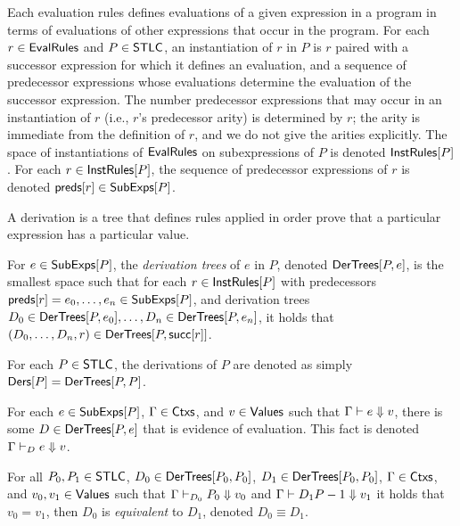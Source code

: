 Each evaluation rules defines evaluations of a given expression in a
program in terms of evaluations of other expressions that occur in the
program.
%
For each $r \in \mathsf{EvalRules}$ and $P \in \mathsf{STLC}$, an instantiation of $r$
in $P$ is $r$ paired with a successor expression for which it defines
an evaluation, and a sequence of predecessor expressions whose
evaluations determine the evaluation of the successor expression.
%
The number predecessor expressions that may occur in an instantiation
of $r$ (i.e., $r$'s predecessor arity) is determined by $r$;
%
the arity is immediate from the definition of $r$, and we do not give
the arities explicitly.
%
The space of instantiations of $\mathsf{EvalRules}$ on subexpressions of $P$
is denoted $\mathsf{InstRules}[ P ]$.
%
For each $r \in \mathsf{InstRules}[ P ]$, the sequence of predecessor
expressions of $r$ is denoted $\mathsf{preds}[ r ] \in \mathsf{SubExps}[ P ]$.

A derivation is a tree that defines rules applied in order prove that
a particular expression has a particular value.
%
\begin{defn}
  For $e \in \mathsf{SubExps}[ P ]$, the \emph{derivation trees} of $e$ in $P$,
  denoted $\mathsf{DerTrees}[ P, e ]$, is the smallest space such that for each
  $r \in \mathsf{InstRules}[ P ]$ with predecessors $\mathsf{preds}[ r ] = e_0,
  \ldots, e_n \in \mathsf{SubExps}[ P ]$, and derivation trees $D_0 \in
  \mathsf{DerTrees}[ P, e_0 ], \ldots, D_n \in \mathsf{DerTrees}[ P, e_n ]$, it holds that
  $(D_0, \ldots, D_n, r) \in \mathsf{DerTrees}[ P, \mathsf{succ}[ r ] ]$.
\end{defn}
%
For each $P \in \mathsf{STLC}$, the derivations of $P$ are denoted as simply
$\mathsf{Ders}[ P ] = \mathsf{DerTrees}[ P, P ]$.

For each $e \in \mathsf{SubExps}[ P ]$, $\Gamma \in \mathsf{Ctxs}$, and $v \in \mathsf{Values}$
such that $\Gamma \vdash e \Downarrow v$, there is some $D \in
\mathsf{DerTrees}[ P, e ]$ that is evidence of evaluation.
%
This fact is denoted $\Gamma \vdash_D e \Downarrow v$.

For all $P_0, P_1 \in \mathsf{STLC}$, $D_0 \in \mathsf{DerTrees}[ P_0, P_0 ]$, $D_1 \in
\mathsf{DerTrees}[ P_0, P_0 ]$, $\Gamma \in \mathsf{Ctxs}$, and $v_0, v_1 \in \mathsf{Values}$
such that $\Gamma \vdash_{D_0} P_0 \Downarrow v_0$ and $\Gamma
\vdash{D_1} P-1 \Downarrow v_1$ it holds that $v_0 = v_1$, then $D_0$
is \emph{equivalent} to $D_1$, denoted $D_0 \equiv D_1$.

